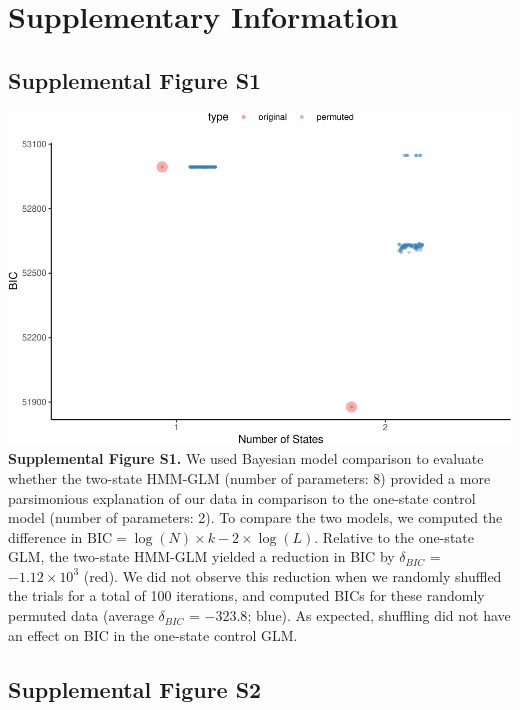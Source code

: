 \documentclass[
]{article}
\begin{document}
\newpage

\hypertarget{supplementary-information}{%
\section{Supplementary Information}\label{supplementary-information}}

\hypertarget{supplemental-figure-s1}{%
\subsection{Supplemental Figure S1}\label{supplemental-figure-s1}}

\includegraphics{predictive_templates_files/figure-latex/rev_Supplemental_Figure_S1-1.pdf}
\textbf{Supplemental Figure S1.} We used Bayesian model comparison to
evaluate whether the two-state HMM-GLM (number of parameters: 8)
provided a more parsimonious explanation of our data in comparison to
the one-state control model (number of parameters: 2). To compare the
two models, we computed the difference in
\(\text{BIC} = \log(N) \times k - 2 \times \log(L)\). Relative to the
one-state GLM, the two-state HMM-GLM yielded a reduction in BIC by
\(\delta_{BIC}\) = \(\ensuremath{-1.12\times 10^{3}}\) (red). We did not
observe this reduction when we randomly shuffled the trials for a total
of 100 iterations, and computed BICs for these randomly permuted data
(average \(\delta_{BIC}\) = \(-323.8\); blue). As expected, shuffling
did not have an effect on BIC in the one-state control GLM.

\newpage

\hypertarget{supplemental-figure-s2}{%
\subsection{Supplemental Figure S2}\label{supplemental-figure-s2}}
\end{document}
